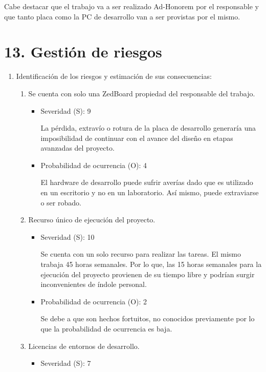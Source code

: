 \documentclass[
11pt, %
]{charter}
\begin{document}
Cabe destacar que el trabajo va a ser realizado Ad-Honorem por el responsable y que tanto placa como la PC de desarrollo van a ser provistas por el mismo.

\clearpage

\section{13. Gestión de riesgos}
\label{sec:riesgos}

\begin{enumerate}[]
	\item Identificación de los riesgos y estimación de sus consecuencias:
	\begin{enumerate}[$\text{Riesgo}$ 1:, leftmargin=*,align=left] 
		
		\item Se cuenta con solo una ZedBoard propiedad del responsable del trabajo.
		\begin{itemize}
			\item Severidad (S): 9
			
			La pérdida, extravío o rotura de la placa de desarrollo generaría una imposibilidad de continuar con el avance del diseño en etapas avanzadas del proyecto.
			\item Probabilidad de ocurrencia (O): 4
			
			El hardware de desarrollo puede sufrir averías dado que es utilizado en un escritorio y no en un laboratorio. Así mismo, puede extraviarse o ser robado.
		\end{itemize}

		\item Recurso único de ejecución del proyecto.
		\begin{itemize}
			\item Severidad (S): 10
			
			Se cuenta con un solo recurso para realizar las tareas. El mismo trabaja 45 horas semanales. Por lo que, las 15 horas semanales para la ejecución del proyecto provienen de su tiempo libre y podrían surgir inconvenientes de índole personal.
			\item Probabilidad de ocurrencia (O): 2
			
			Se debe a que son hechos fortuitos, no conocidos previamente por lo que la probabilidad de ocurrencia es baja.
		\end{itemize}

		\item Licencias de entornos de desarrollo.
		\begin{itemize}
			\item Severidad (S): 7
			

\end{itemize}
\end{enumerate}
\end{enumerate}
\end{document}
